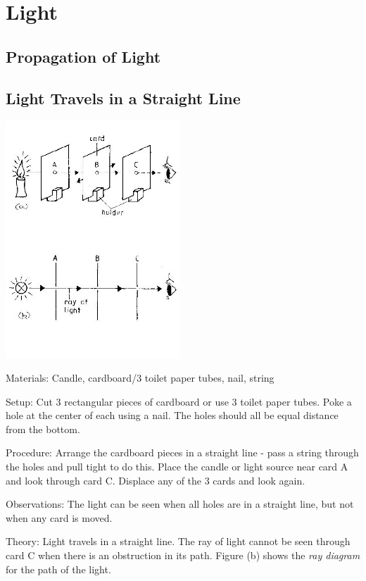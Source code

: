 \section{Light} 

\begin{multicols}{2}


\section*{Propagation of Light}


\subsection{Light Travels in a Straight Line}

\begin{center}
\includegraphics[width=0.49\textwidth]{./img/source/prop-of-light-2.jpg}
\end{center}

\begin{description*}
\item[Materials:]{Candle, cardboard/3 toilet paper tubes, nail, string}
\item[Setup:]{Cut 3 rectangular pieces of cardboard or use 3 toilet paper tubes. Poke a hole at the center of each using a nail. The holes should all be equal distance from the bottom.}
\item[Procedure:]{Arrange the cardboard pieces in a straight line - pass a string through the holes and pull tight to do this. Place the candle or light source near card A and look through card C. Displace any of the 3 cards and look again.}
\item[Observations:]{The light can be seen when all holes are in a straight line, but not when any card is moved.}
\item[Theory:]{Light travels in a straight line. The ray of light cannot be seen through card C when there is an obstruction in its path. Figure (b) shows the \emph{ray diagram} for the path of the light.}
\end{description*}


\end{multicols}
